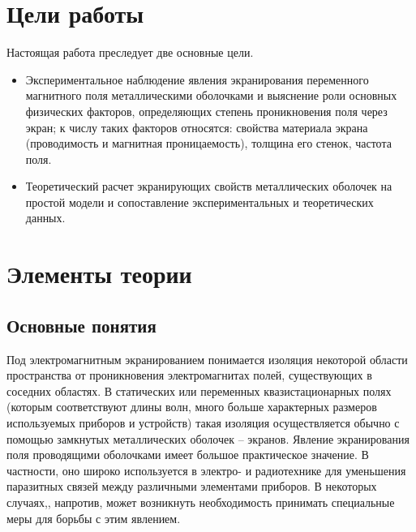 
\usepackage{gensymb}
\usepackage{textcomp}
\usepackage{mathrsfs}

\def\labauthors{Войтович Д.А., Понур К.А.}
\def\labgroup{440}
\def\department{Кафедра электродинамики}
\def\labnumber{1}
\def\labtheme{Электромагнитное экранирование}

\renewcommand{\phi}{\varphi}

\def\E{\mathscr{E}_H}
\def\Rdim{\,\frac{\text{м}^3}{\text{А} \cdot \text{с}}}

\tableofcontents
\newpage
\section*{Цели работы}

Настоящая работа преследует две основные цели.
\begin{itemize}
        \item Экспериментальное наблюдение явления экранирования переменного магнитного поля металлическими оболочками и выяснение роли основных физических факторов, определяющих степень проникновения поля через экран; к числу таких факторов относятся: свойства материала экрана (проводимость и магнитная проницаемость), толщина его стенок, частота поля.
        \item Теоретический расчет экранирующих свойств металлических оболочек на простой модели и сопоставление экспериментальных и теоретических данных.
\end{itemize}
\section{Элементы теории}%
\subsection{Основные понятия}%
\label{sub:2.1}
Под электромагнитным экранированием понимается изоляция некоторой
области пространства от проникновения электромагнитах полей, существующих в соседних областях. 
В статических или переменных квазистационарных полях (которым соответствуют длины волн, много больше характерных размеров используемых приборов и устройств) такая изоляция осуществляется обычно с помощью замкнутых металлических оболочек -- экранов. Явление экранирования поля проводящими оболочками имеет большое практическое значение. В частности, оно широко используется в электро- и радиотехнике для уменьшения паразитных связей между различными элементами приборов. В некоторых случаях,, напротив, может возникнуть необходимость принимать специальные меры для борьбы с этим явлением.

